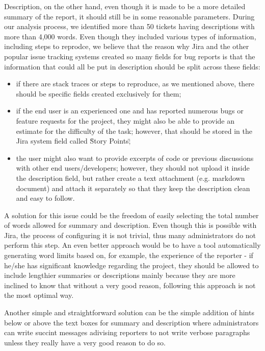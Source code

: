 \documentclass{mpaper}
\begin{document}
Description, on the other hand, even though it is made to be a more detailed summary of the report, it should still be
in some reasonable parameters. During our analysis process, we identified more than 50 tickets having descriptions 
with more than 4,000 words. Even though they included various types of information, including steps to reprodce, 
we believe that the reason why Jira and the other popular issue tracking systems created so many fields for bug reports 
is that the information that could all be put in description should be split across these fields: 
\begin{itemize}
  \item if there are stack traces or steps to reproduce, as we mentioned above, there should be specific fields 
  created exclusively for them; 
  \item if the end user is an experienced one and has reported numerous bugs or feature requests for the project, 
  they might also be able to provide an estimate for the difficulty of the task; however, that should be stored in the 
  Jira system field called \"Story Points\";
  \item the user might also want to provide excerpts of code or previous discussions with other end users/developers; 
  however, they should not upload it inside the description field, but rather create a text attachment (e.g. markdown
  document) and attach it separately so that they keep the description clean and easy to follow.
\end{itemize}

A solution for this issue could be the freedom of easily selecting the total number of words allowed for summary and 
description. Even though this is possible with Jira, the process of configuring it is not trivial, thus many 
administrators do not perform this step. An even better approach would be to have a tool automatically generating 
word limits based on, for example, the experience of the reporter - if he/she has significant knowledge regarding 
the project, they should be allowed to include lengthier summaries or descriptions mainly because they are more inclined 
to know that without a very good reason, following this approach is not the most optimal way. 

Another simple and straightforward solution can be the simple addition of hints below or above the text boxes for summary 
and description where administrators can write succint messages adivising reporters to not write verbose paragraphs 
unless they really have a very good reason to do so.
\end{document}
